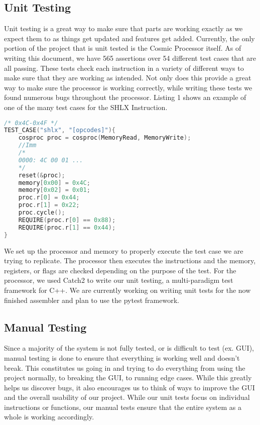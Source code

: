 \documentclass[conference]{IEEEtran}
\begin{document}
\subsection{Unit Testing}
Unit testing is a great way to make sure that parts are working exactly as we expect them to as things get updated and features get added. Currently, the only portion of the project that is unit tested is the Cosmic Processor itself. As of writing this document, we have 565 assertions over 54 different test cases that are all passing. These tests check each instruction in a variety of different ways to make sure that they are working as intended. Not only does this provide a great way to make sure the processor is working correctly, while writing these tests we found numerous bugs throughout the processor. Listing 1 shows an example of one of the many test cases for the SHLX Instruction. 
\begin{lstlisting}[language=C++, caption=A Unit Test for the SHLX Instruction]
/* 0x4C-0x4F */
TEST_CASE("shlx", "[opcodes]"){
    cosproc proc = cosproc(MemoryRead, MemoryWrite);
    //Imm
    /*
    0000: 4C 00 01 ...
    */
    reset(&proc);
    memory[0x00] = 0x4C;
    memory[0x02] = 0x01;
    proc.r[0] = 0x44;
    proc.r[1] = 0x22;
    proc.cycle();
    REQUIRE(proc.r[0] == 0x88);
    REQUIRE(proc.r[1] == 0x44);
}
\end{lstlisting}
We set up the processor and memory to properly execute the test case we are trying to replicate. The processor then executes the instructions and the memory, registers, or flags are checked depending on the purpose of the test. For the processor, we used Catch2 to write our unit testing, a multi-paradigm test framework for C++. We are currently working on writing unit tests for the now finished assembler and plan to use the pytest framework.

\subsection{Manual Testing}
Since a majority of the system is not fully tested, or is difficult to test (ex. GUI), manual testing is done to ensure that everything is working well and doesn't break. This constitutes us going in and trying to do everything from using the project normally, to breaking the GUI, to running edge cases. While this greatly helps us discover bugs, it also encourages us to think of ways to improve the GUI and the overall usability of our project. While our unit tests focus on individual instructions or functions, our manual tests ensure that the entire system as a whole is working accordingly.
\end{document}
